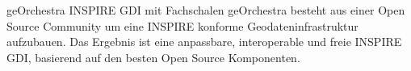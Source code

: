 %
{geOrchestra}%
{INSPIRE GDI mit Fachschalen}%
{
geOrchestra besteht aus einer Open Source Community um eine INSPIRE konforme Geodateninfrastruktur aufzubauen. Das Ergebnis ist eine anpassbare, interoperable und freie INSPIRE GDI, basierend auf den besten Open Source Komponenten.%
}

\label{bof-mittwoch}

\label{social-event}
\RaggedRight
{}
\justifying
